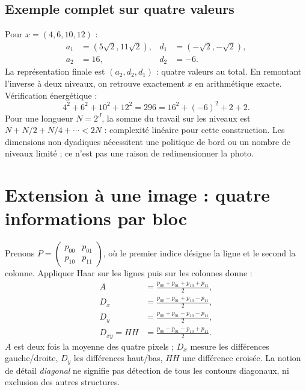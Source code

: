 \subsection{Exemple complet sur quatre valeurs}
Pour $x=(4,6,10,12)$ :
\begin{align}
a_1&=(5\sqrt{2},11\sqrt{2}),&d_1&=(-\sqrt{2},-\sqrt{2}),\\
a_2&=16,&d_2&=-6.
\end{align}
La représentation finale est $(a_2,d_2,d_1)$ : quatre valeurs au total.
En remontant l'inverse à deux niveaux, on retrouve exactement $x$ en
arithmétique exacte. Vérification énergétique :
\begin{equation}
4^2+6^2+10^2+12^2=296=16^2+(-6)^2+2+2.
\end{equation}
Pour une longueur $N=2^J$, la somme du travail sur les niveaux est
$N+N/2+N/4+\cdots<2N$ : complexité linéaire pour cette construction.
Les dimensions non dyadiques nécessitent une politique de bord ou un
nombre de niveaux limité ; ce n'est pas une raison de redimensionner la photo.

\section{Extension à une image : quatre informations par bloc}
Prenons $P=\begin{pmatrix}p_{00}&p_{01}\\p_{10}&p_{11}\end{pmatrix}$,
où le premier indice désigne la ligne et le second la colonne.
Appliquer Haar sur les lignes puis sur les colonnes donne :
\begin{align}
A&=\frac{p_{00}+p_{01}+p_{10}+p_{11}}{2},\\
D_x&=\frac{p_{00}-p_{01}+p_{10}-p_{11}}{2},\\
D_y&=\frac{p_{00}+p_{01}-p_{10}-p_{11}}{2},\\
D_{xy}=HH&=\frac{p_{00}-p_{01}-p_{10}+p_{11}}{2}.\label{eq:hh}
\end{align}
$A$ est deux fois la moyenne des quatre pixels ; $D_x$ mesure les différences
gauche/droite, $D_y$ les différences haut/bas, $HH$ une différence croisée.
La notion de détail \emph{diagonal} ne signifie pas détection de tous les
contours diagonaux, ni exclusion des autres structures.


